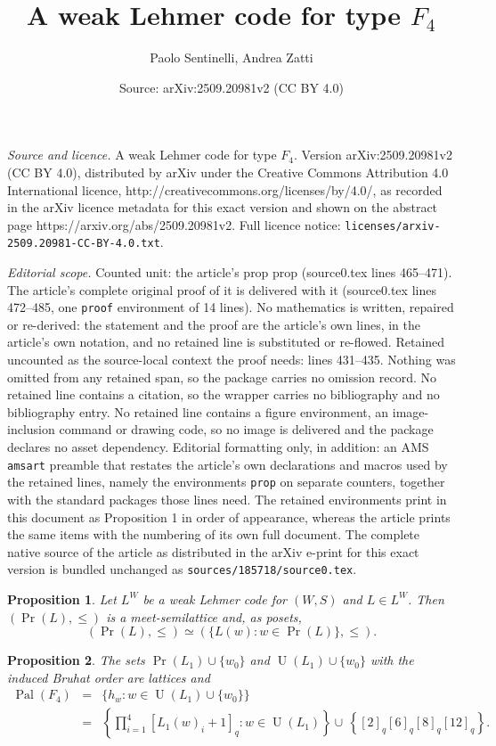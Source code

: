 \documentclass[10pt,a4paper]{amsart}
\title{A weak Lehmer code for type $F_4$}
\author{Paolo Sentinelli, Andrea Zatti}
\date{Source: arXiv:2509.20981v2 (CC BY 4.0)}
\newtheorem{prop}{Proposition}
\DeclareMathOperator{\Pal}{\mathrm{Pal}}
\DeclareMathOperator{\U}{\mathrm{U}}
\renewcommand{\leq}{\leqslant}
\begin{document}
\maketitle

\noindent\emph{Source and licence.} A weak Lehmer code for type $F_4$. Version arXiv:2509.20981v2 (CC BY 4.0), distributed by arXiv under the Creative Commons Attribution 4.0 International licence, http://creativecommons.org/licenses/by/4.0/, as recorded in the arXiv licence metadata for this exact version and shown on the abstract page https://arxiv.org/abs/2509.20981v2. Full licence notice: \texttt{licenses/arxiv-2509.20981-CC-BY-4.0.txt}.\par\smallskip

\noindent\textit{Editorial scope.} Counted unit: the article's prop prop (source0.tex lines 465--471). The article's complete original proof of it is delivered with it (source0.tex lines 472--485, one \texttt{proof} environment of 14 lines). No mathematics is written, repaired or re-derived: the statement and the proof are the article's own lines, in the article's own notation, and no retained line is substituted or re-flowed.  Retained uncounted as the source-local context the proof needs: lines 431--435.  Nothing was omitted from any retained span, so the package carries no omission record.  No retained line contains a citation, so the wrapper carries no bibliography and no bibliography entry.  No retained line contains a figure environment, an image-inclusion command or drawing code, so no image is delivered and the package declares no asset dependency.  Editorial formatting only, in addition: an AMS \texttt{amsart} preamble that restates the article's own declarations and macros used by the retained lines, namely the environments \texttt{prop} on separate counters, together with the standard packages those lines need.  The retained environments print in this document as Proposition 1 in order of appearance, whereas the article prints the same items with the numbering of its own full document.  The complete native source of the article as distributed in the arXiv e-print for this exact version is bundled unchanged as \texttt{sources/185718/source0.tex}.
\begin{prop} \label{prop reticolo}
    Let $L^W$ be a weak Lehmer code for $(W,S)$ and $L\in L^W$. Then
    $(\Pr(L), \leq)$ is a meet-semilattice and, as posets, 
    $$(\Pr(L), \leq) \simeq (\{L(w): w\in \Pr(L)\},\leq).$$
\end{prop}

\begin{prop}
The sets $\Pr(L_1) \cup \{w_0\}$ and $\U(L_1) \cup \{w_0\}$ with the induced Bruhat order are lattices and 
\begin{eqnarray*}
   \Pal(F_4) &=&\{h_w: w \in \U(L_1)\cup \{w_0\} \} \\
            &=& \left\{\prod_{i=1}^4[L_1(w)_i+1]_q: w \in \U(L_1) \right\}  \cup \, \left\{[2]_q[6]_q[8]_q[12]_q\right\}.
 \end{eqnarray*}
\end{prop}
\end{document}
